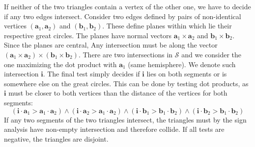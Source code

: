 If neither of the two triangles contain a vertex of the other one, we have to decide if any two edges intersect. Consider two edges defined by pairs of non-identical vertices $(\mathbf{a}_1, \mathbf{a}_2)$ and $(\mathbf{b}_1, \mathbf{b}_2)$. These define planes within which lie their respective great circles. The planes have normal vectors $\mathbf{a}_1 \times \mathbf{a}_2$ and $\mathbf{b}_1 \times \mathbf{b}_2$. Since the planes are central, Any intersection must be along the vector $(\mathbf{a}_1 \times \mathbf{a}_2)\times(\mathbf{b}_1 \times \mathbf{b}_2)$. There are two intersections in $\mathcal{S}$ and we consider the one maximizing the dot product with $\mathbf{a}_1$ (same hemisphere). We denote such intersection $\mathbf{i}$. The final test simply decides if $\mathbf{i}$ lies on both segments or is somewhere else on the great circles. This can be done by testing dot products, as $\mathbf{i}$ must be closer to both vertices than the distance of the vertices for both segments:
$$(\mathbf{i}\cdot\mathbf{a}_1 > \mathbf{a}_1\cdot\mathbf{a}_2) \land (\mathbf{i}\cdot\mathbf{a}_2 > \mathbf{a}_1\cdot\mathbf{a}_2)\land(\mathbf{i}\cdot\mathbf{b}_1 > \mathbf{b}_1\cdot\mathbf{b}_2) \land (\mathbf{i}\cdot\mathbf{b}_2 > \mathbf{b}_1\cdot\mathbf{b}_2)$$
If any two segments of the two triangles intersect, the triangles must by the sign analysis have non-empty intersection and therefore collide. If all tests are negative, the triangles are disjoint.
